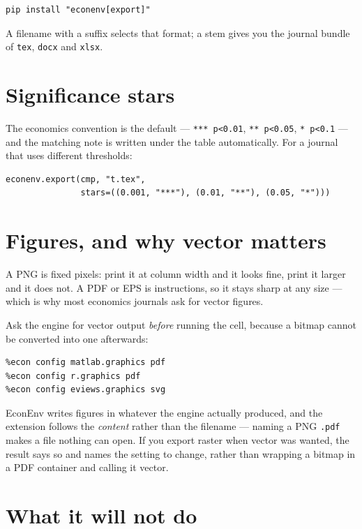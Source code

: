 \documentclass[11pt,a4paper]{report}
\begin{document}
\begin{lstlisting}
pip install "econenv[export]"
\end{lstlisting}

A filename with a suffix selects that format; a stem gives you the journal
bundle of \texttt{tex}, \texttt{docx} and \texttt{xlsx}.

\section{Significance stars}

The economics convention is the default --- \texttt{*** p<0.01},
\texttt{** p<0.05}, \texttt{* p<0.1} --- and the matching note is written under
the table automatically. For a journal that uses different thresholds:

\begin{lstlisting}
econenv.export(cmp, "t.tex",
               stars=((0.001, "***"), (0.01, "**"), (0.05, "*")))
\end{lstlisting}

\section{Figures, and why vector matters}

A PNG is fixed pixels: print it at column width and it looks fine, print it
larger and it does not. A PDF or EPS is instructions, so it stays sharp at any
size --- which is why most economics journals ask for vector figures.

Ask the engine for vector output \emph{before} running the cell, because a
bitmap cannot be converted into one afterwards:

\begin{lstlisting}
%econ config matlab.graphics pdf
%econ config r.graphics pdf
%econ config eviews.graphics svg
\end{lstlisting}

\begin{note}
EconEnv writes figures in whatever the engine actually produced, and the
extension follows the \emph{content} rather than the filename --- naming a PNG
\texttt{.pdf} makes a file nothing can open. If you export raster when vector
was wanted, the result says so and names the setting to change, rather than
wrapping a bitmap in a PDF container and calling it vector.
\end{note}

\section{What it will not do}
\end{document}
